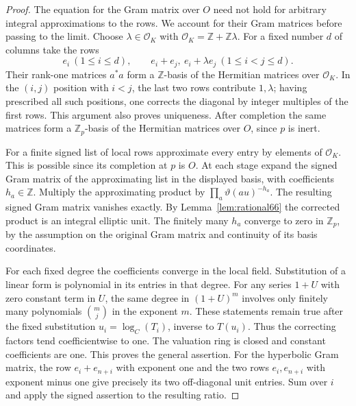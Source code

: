\documentclass[a4paper,11pt]{article}
\theoremstyle{definition}
\theoremstyle{remark}
\newcommand{\ZZ}{\mathbb Z}\newcommand{\ord}{\operatorname{ord}}
\numberwithin{equation}{section}
\begin{document}
\begin{proof}
The equation for the Gram matrix over \(O\) need not hold for
arbitrary integral approximations to the rows. We account for their
Gram matrices before passing to the limit. Choose
\(\lambda\in\mathcal O_K\) with
\(\mathcal O_K=\ZZ+\ZZ\lambda\).
For a fixed number \(d\) of columns take the rows
\[
 e_i\ (1\le i\le d),\qquad
 e_i+e_j,\ e_i+\lambda e_j\ (1\le i<j\le d).
\]
Their rank-one matrices \(a^*a\) form a \(\ZZ\)-basis of
the Hermitian matrices over \(\mathcal O_K\). In the \((i,j)\)
position with \(i<j\), the last two rows contribute \(1,\lambda\);
having prescribed all such positions, one corrects the diagonal
by integer multiples of the first rows. This argument also proves
uniqueness. After completion the same matrices form a
\(\ZZ_p\)-basis of the Hermitian matrices over \(O\), since
\(p\) is inert.

For a finite signed list of local rows approximate every entry
by elements of \(\mathcal O_K\). This is possible since its
completion at \(p\) is \(O\). At each stage expand the signed
Gram matrix of the approximating list in the displayed basis,
with coefficients \(h_a\in\ZZ\). Multiply the approximating
product by \(\prod_a\vartheta(a u)^{-h_a}\).
The resulting signed Gram matrix vanishes exactly. By
Lemma~\ref{lem:rational66} the corrected product is an integral
elliptic unit. The finitely many \(h_a\) converge to zero in
\(\ZZ_p\), by the assumption on the original Gram matrix and
continuity of its basis coordinates.

For each fixed degree the coefficients converge in the local
field. Substitution of a linear form is polynomial in its entries
in that degree. For any series \(1+U\) with zero constant term
in \(U\), the same degree in \((1+U)^m\) involves only finitely
many polynomials \(\binom mj\) in the exponent \(m\). These
statements remain true after the fixed substitution
\(u_i=\log_C(T_i)\), inverse to \(T(u_i)\). Thus the correcting
factors tend coefficientwise to one. The valuation ring is
closed and constant coefficients are one. This proves the general
assertion. For the hyperbolic Gram matrix, the row \(e_i+e_{n+i}\)
with exponent one and the two rows \(e_i,e_{n+i}\) with
exponent minus one give precisely its two off-diagonal unit
entries. Sum over \(i\) and apply the signed assertion to
the resulting ratio.
\end{proof}
\end{document}
